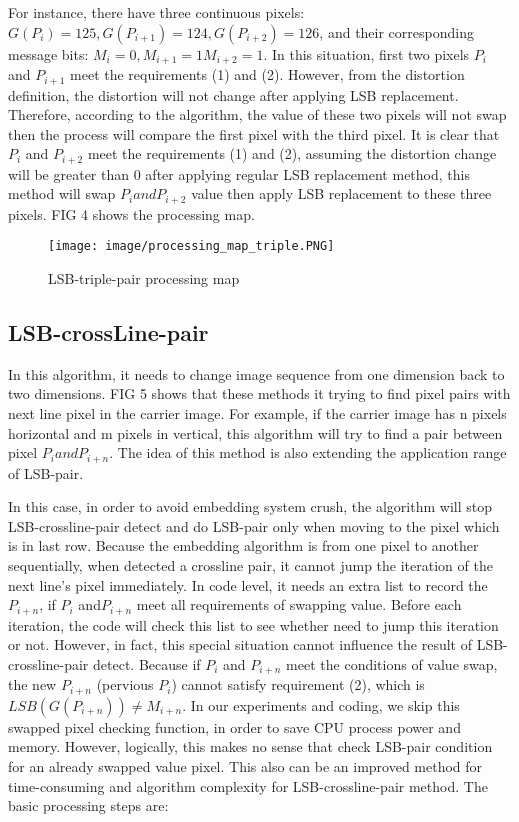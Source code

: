 \documentclass[%
    reprint,
    amsmath,amssymb,
    aps,
   ]{revtex4-1}
\begin{document}
   For instance, there have three continuous pixels: \(G(P_{i}) = 125, G(P_{i+1}) = 124, G(P_{i+2}) = 126\), and their corresponding message bits: \(M_{i} = 0, M_{i+1} = 1 M_{i+2} = 1\). In this situation, first two pixels \(P_{i}\) and \(P_{i+1}\) meet the requirements (1) and (2). However, from the distortion definition, the distortion will not change after applying LSB replacement. Therefore, according to the algorithm, the value of these two pixels will not swap then the process will compare the first pixel with the third pixel. It is clear that \(P_{i}\) and \(P_{i+2}\) meet the requirements (1) and (2), assuming the distortion change will be greater than 0 after applying regular LSB replacement method, this method will swap \(P_{i} and P_{i+2}\) value then apply LSB replacement to these three pixels. FIG 4 shows the processing map.
   
   
   \begin{figure}[h]
   \texttt{[image: image/processing\_map\_triple.PNG]}
   \caption{LSB-triple-pair processing map}
   \label{fig:figure}
   \end{figure}    
   
   
   
   
   \subsection{\label{sec:level2}LSB-crossLine-pair}
   
   In this algorithm, it needs to change image sequence from one dimension back to two dimensions. FIG 5 shows that these methods it trying to find pixel pairs with next line pixel in the carrier image. For example, if the carrier image has n pixels horizontal and m pixels in vertical, this algorithm will try to find a pair between pixel \(P_{i} and P_{i+n}\). The idea of this method is also extending the application range of LSB-pair.  
   
   In this case, in order to avoid embedding system crush, the algorithm will stop LSB-crossline-pair detect and do LSB-pair only when moving to the pixel which is in last row. Because the embedding algorithm is from one pixel to another sequentially, when detected a crossline pair, it cannot jump the iteration of the next line’s pixel immediately. In code level, it needs an extra list to record the \(P_{i+n}\), if \(P_{i}\) and\(P_{i+n}\) meet all requirements of swapping value. Before each iteration, the code will check this list to see whether need to jump this iteration or not. However, in fact, this special situation cannot influence the result of LSB-crossline-pair detect. Because if \(P_{i}\) and \(P_{i+n}\) meet the conditions of value swap, the new \(P_{i+n}\) (pervious \(P_{i}\)) cannot satisfy requirement (2), which is \(LSB(G(P_{i+n})) \neq M_{i+n}\). In our experiments and coding, we skip this swapped pixel checking function, in order to save CPU process power and memory. However, logically, this makes no sense that check LSB-pair condition for an already swapped value pixel. This also can be an improved method for time-consuming and algorithm complexity for LSB-crossline-pair method. The basic processing steps are:
   
\end{document}
